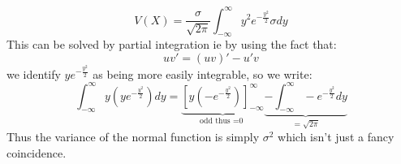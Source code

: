 \documentclass[a4paper,10pt]{article}
\begin{document}
\begin{equation}
V(X)=\frac{\sigma }{ \sqrt{2\pi}}   \int_{-\infty}^{\infty}y^2 e^{-\frac{y^2}{2}}\sigma dy
\end{equation}
This can be solved by partial integration ie by using the fact that:
\begin{equation*}
  uv'= (uv)' -u'v
\end{equation*}
we identify $ y e^{-\frac{y^2}{2}}$ as being more easily integrable, so we write:
\begin{equation*}
  \int_{-\infty}^{\infty} y\left( ye^{-\frac{y^2}{2}} \right)dy=\underbrace{\left[ y( -e^{-\frac{y^2}{2}})\right]_{-\infty}^{\infty}}_{\textrm{odd thus =0 }} \underbrace{-\int_{-\infty}^{\infty}-e^{-\frac{y^2}{2}}dy}_{=\sqrt{2\pi}} 
\end{equation*}
Thus the variance of the normal function is simply $\sigma^2 $ which isn't just a fancy coincidence.
\end{document}

